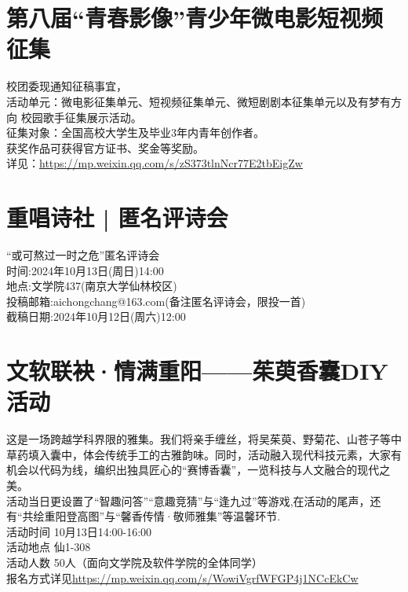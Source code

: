\documentclass[letterpaper, 12pt]{article}
\begin{document}
\begin{multicols}{2}
\section{第八届“青春影像”青少年微电影短视频征集}
校团委现通知征稿事宜，\\
活动单元：微电影征集单元、短视频征集单元、微短剧剧本征集单元以及有梦有方向 校园歌手征集展示活动。\\
征集对象：全国高校大学生及毕业3年内青年创作者。\\
获奖作品可获得官方证书、奖金等奖励。\\
详见：\url{https://mp.weixin.qq.com/s/zS373tlnNcr77E2tbEigZw}
\section{重唱诗社 | 匿名评诗会}
“或可熬过一时之危”匿名评诗会\\
时间:2024年10月13日(周日)14:00\\
地点:文学院437(南京大学仙林校区)\\
投稿邮箱:aichongchang@163.com(备注匿名评诗会，限投一首)\\
截稿日期:2024年10月12日(周六)12:00\\
\section{文软联袂·情满重阳——茱萸香囊DIY活动}
这是一场跨越学科界限的雅集。我们将亲手缠丝，将吴茱萸、野菊花、山苍子等中草药填入囊中，体会传统手工的古雅韵味。同时，活动融入现代科技元素，大家有机会以代码为线，编织出独具匠心的“赛博香囊”，一览科技与人文融合的现代之美。\\
活动当日更设置了“智趣问答”“意趣竞猜”与“逢九过”等游戏,在活动的尾声，还有“共绘重阳登高图”与“馨香传情·敬师雅集”等温馨环节.\\
活动时间 10月13日14:00-16:00\\
活动地点 仙1-308\\
活动人数 50人（面向文学院及软件学院的全体同学）\\
报名方式详见\url{https://mp.weixin.qq.com/s/WowiVgrfWFGP4j1NCcEkCw}

\end{multicols} 
\end{document}
